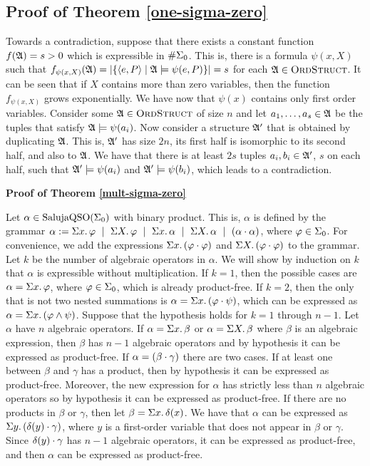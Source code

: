 \subsection{Proof of Theorem \ref{one-sigma-zero}}

Towards a contradiction, suppose that there exists a constant function $f(\mathfrak{A}) = s > 0$ which is expressible in $\#\Sigma_{0}$. This is, there is a formula $\psi(x,X)$ such that $f_{\psi(x,X)}(\mathfrak{A}) = \vert \{ \langle e,P\rangle \mid \mathfrak{A}\models\psi(e,P) \} \vert = s$ for each $\mathfrak{A}\in\text{\sc OrdStruct}$. It can be seen that if $X$ contains more than zero variables, then the function $f_{\psi(x,X)}$ grows exponentially. We have now that $\psi(x)$ contains only first order variables. Consider some $\mathfrak{A} \in \text{\sc OrdStruct}$ of size $n$ and let $a_1,\ldots,a_s\in \mathfrak{A}$ be the tuples that satisfy $\mathfrak{A} \models \psi(a_i)$. Now consider a structure $\mathfrak{A}'$ that is obtained by duplicating $\mathfrak{A}$. This is, $\mathfrak{A}'$ has size $2n$, its first half is isomorphic to its second half, and also to $\mathfrak{A}$. We have that there is at least $2s$ tuples $a_i,b_i\in \mathfrak{A}'$, $s$ on each half, such that $\mathfrak{A}'\models\psi(a_i)$ and $\mathfrak{A}'\models\psi(b_i)$, which leads to a contradiction.

\textbf{Proof of Theorem \ref{mult-sigma-zero}}

Let $\alpha \in \text{\rm Saluja}{\rm QSO}(\Sigma_{0})$ with binary product. This is, $\alpha$ is defined by the grammar $\alpha := \sa{x}\varphi \ \mid \ \sa{X}\varphi \ \mid \ \sa{x}\alpha \ \mid \ \sa{X}\alpha \ \mid \ (\alpha\mult\alpha)$, where $\varphi \in \Sigma_{0}$. For convenience, we add the expressions $\Sigma{x}.\,(\varphi\cdot\varphi)$ and $\Sigma{X}.\,(\varphi\cdot\varphi)$ to the grammar. Let $k$ be the number of algebraic operators in $\alpha$. We will show by induction on $k$ that $\alpha$ is expressible without multiplication. If $k = 1$, then the possible cases are $\alpha = \Sigma{x}.\,\varphi$, where $\varphi\in\Sigma_{0}$, which is already product-free. If $k = 2$, then the only that is not two nested summations is $\alpha = \Sigma{x}.\,(\varphi\cdot\psi)$, which can be expressed as $\alpha = \Sigma{x}.\,(\varphi\wedge\psi)$. Suppose that the hypothesis holds for $k = 1$ through $n-1$. Let $\alpha$ have $n$ algebraic operators. If $\alpha = \Sigma{x}.\,\beta$ or $\alpha = \Sigma{X}.\,\beta$ where $\beta$ is an algebraic expression, then $\beta$ has $n-1$ algebraic operators and by hypothesis it can be expressed as product-free. If $\alpha = (\beta \cdot \gamma)$ there are two cases. If at least one between $\beta$ and $\gamma$ has a product, then by hypothesis it can be expressed as product-free. Moreover, the new expression for $\alpha$ has strictly less than $n$ algebraic operators so by hypothesis it can be expressed as product-free. If there are no products in $\beta$ or $\gamma$, then let $\beta = \Sigma{x}.\,\delta(x)$. We have that $\alpha$ can be expressed as $\Sigma{y}.\,(\delta(y)\cdot\gamma)$, where $y$ is a first-order variable that does not appear in $\beta$ or $\gamma$. Since $\delta(y)\cdot\gamma$ has $n-1$ algebraic operators, it can be expressed as product-free, and then $\alpha$ can be expressed as product-free.

